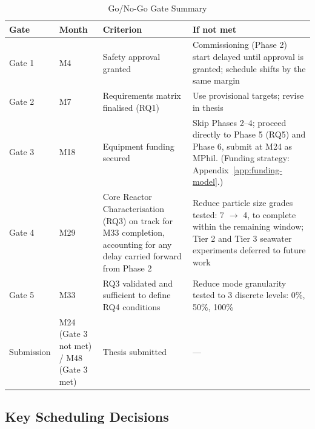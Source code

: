 \documentclass[12pt]{article}
\begin{document}
\begin{table}[h!]
\centering
\small
\setlength{\tabcolsep}{4pt}
\begin{tabularx}{\linewidth}{|>{\centering\arraybackslash}p{1.9cm}|>{\centering\arraybackslash}p{2.9cm}|p{3.9cm}|X|}
\hline
\textbf{Gate} & \textbf{Month} & \textbf{Criterion} & \textbf{If not met} \\
\hline
Gate 1 & M4  & Safety approval granted & Commissioning (Phase 2) start delayed until approval is granted; schedule shifts by the same margin \\
\hline
Gate 2 & M7  & Requirements matrix finalised (RQ1) & Use provisional targets; revise in thesis \\
\hline
Gate 3 & M18 & Equipment funding secured & Skip Phases 2--4; proceed directly to Phase 5 (RQ5) and Phase 6, submit at M24 as MPhil. (Funding strategy: Appendix~\ref{app:funding-model}.) \\
\hline
Gate 4 & M29 & Core Reactor Characterisation (RQ3) on track for M33 completion, accounting for any delay carried forward from Phase 2 & Reduce particle size grades tested: 7 $\rightarrow$ 4, to complete within the remaining window; Tier 2 and Tier 3 seawater experiments deferred to future work \\
\hline
Gate 5 & M33 & RQ3 validated and sufficient to define RQ4 conditions & Reduce mode granularity tested to 3 discrete levels: 0\%, 50\%, 100\% \\
\hline
Submission & M24 (Gate 3 not met) / M48 (Gate 3 met) & Thesis submitted & --- \\
\hline
\end{tabularx}
\caption{Go/No-Go Gate Summary}
\label{tab:gates}
\end{table}

\subsection*{Key Scheduling Decisions}
\end{document}
